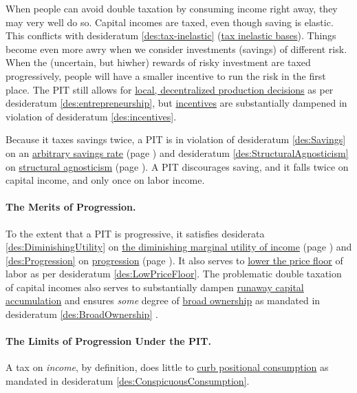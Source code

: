 When people can avoid double taxation by consuming income right away, they may very well do so.
Capital incomes are taxed, even though saving is elastic.
This conflicts with desideratum \ref{des:tax-inelastic} (\hyperref[des:tax-inelastic]{tax inelastic bases}).
Things become even more awry when we consider investments (savings) of different risk.
When the (uncertain, but hiwher) rewards of risky investment are taxed progressively, people will have a smaller incentive to run the risk in the first place.
The PIT still allows for \hyperref[des:entrepreneurship]{local, decentralized production decisions} as per desideratum \ref{des:entrepreneurship}, but \hyperref[des:incentives]{incentives} are substantially dampened in violation of desideratum \ref{des:incentives}.

Because it taxes savings twice, a PIT is in violation of desideratum \ref{des:Savings} on an \hyperref[des:Savings]{arbitrary savings rate} (page \pageref{des:Savings}) and desideratum \ref{des:StructuralAgnosticism} on \hyperref[des:StructuralAgnosticism]{structural agnosticism} (page \pageref{des:StructuralAgnosticism}).
A PIT discourages saving, and it falls twice on capital income, and only once on labor income.

\paragraph{The Merits of Progression.} To the extent that a PIT is progressive, it satisfies desiderata \ref{des:DiminishingUtility} on \hyperref[des:DiminishingUtility]{the diminishing marginal utility of income} (page \pageref{des:DiminishingUtility}) and \ref{des:Progression} on \hyperref[des:Progression]{progression} (page \pageref{des:Progression}).
It also serves to \hyperref[des:LowPriceFloor]{lower the price floor} of labor as per desideratum \ref{des:LowPriceFloor}.
The problematic double taxation of capital incomes also serves to substantially dampen \hyperref[sec:GovDynofIneq]{runaway capital accumulation} and ensures \emph{some} degree of \hyperref[des:BroadOwnership]{broad ownership} as mandated in desideratum \ref{des:BroadOwnership} \citep[810]{McCaffery2005}.

\paragraph{The Limits of Progression Under the PIT.} A tax on \emph{income}, by definition, does little to \hyperref[des:ConspicuousConsumption]{curb positional consumption} as mandated in desideratum \ref{des:ConspicuousConsumption}.

